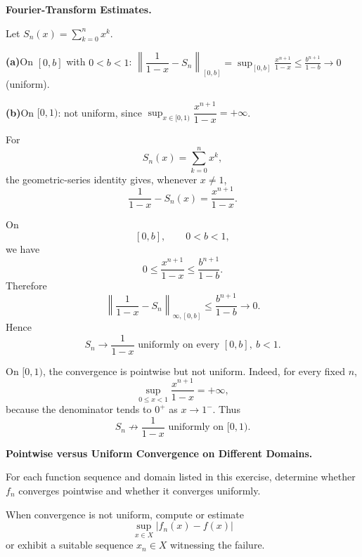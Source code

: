 \begin{problem}[CP-II-0036]
\label{prob:cp-ii-0036}
\textbf{Fourier-Transform Estimates.}

\hspace*{1.5em}Let $S_n(x)=\sum_{k=0}^{n}x^k$.

		\par\smallskip\noindent\textbf{(a)}\quad On $[0,b]$ with $0<b<1$: $\left\|\dfrac{1}{1-x}-S_n\right\|_{[0,b]}
		=\sup_{[0,b]}\frac{x^{n+1}}{1-x}\le \frac{b^{n+1}}{1-b}\to0$ (uniform).
		\par\smallskip\noindent\textbf{(b)}\quad On $[0,1)$: not uniform, since $\sup_{x\in[0,1)}\dfrac{x^{n+1}}{1-x}=+\infty$.
\end{problem}

\begin{solution}
For
\[
S_n(x)=\sum_{k=0}^{n}x^k,
\]
the geometric-series identity gives, whenever \(x\neq1\),
\[
\frac1{1-x}-S_n(x)
=
\frac{x^{n+1}}{1-x}.
\]

On
\[
[0,b],
\qquad
0<b<1,
\]
we have
\[
0\le
\frac{x^{n+1}}{1-x}
\le
\frac{b^{n+1}}{1-b}.
\]
Therefore
\[
\left\|
\frac1{1-x}-S_n
\right\|_{\infty,[0,b]}
\le
\frac{b^{n+1}}{1-b}
\longrightarrow0.
\]
Hence
\[
\boxed{
S_n\to\frac1{1-x}
\text{ uniformly on every }[0,b],\ b<1.
}
\]

On \([0,1)\), the convergence is pointwise but not uniform. Indeed, for every fixed \(n\),
\[
\sup_{0\le x<1}
\frac{x^{n+1}}{1-x}
=
+\infty,
\]
because the denominator tends to \(0^+\) as \(x\to1^-\). Thus
\[
\boxed{
S_n\not\to\frac1{1-x}
\text{ uniformly on }[0,1).
}
\]
\end{solution}


\begin{problem}[CP-II-0037]
\label{prob:cp-ii-0037}
\textbf{Pointwise versus Uniform Convergence on Different Domains.}

\hspace*{1.5em}For each function sequence and domain listed in this exercise, determine
whether \(f_n\) converges pointwise and whether it converges uniformly.

When convergence is not uniform, compute or estimate
\[
\sup_{x\in X}|f_n(x)-f(x)|
\]
or exhibit a suitable sequence \(x_n\in X\) witnessing the failure.
\end{problem}

